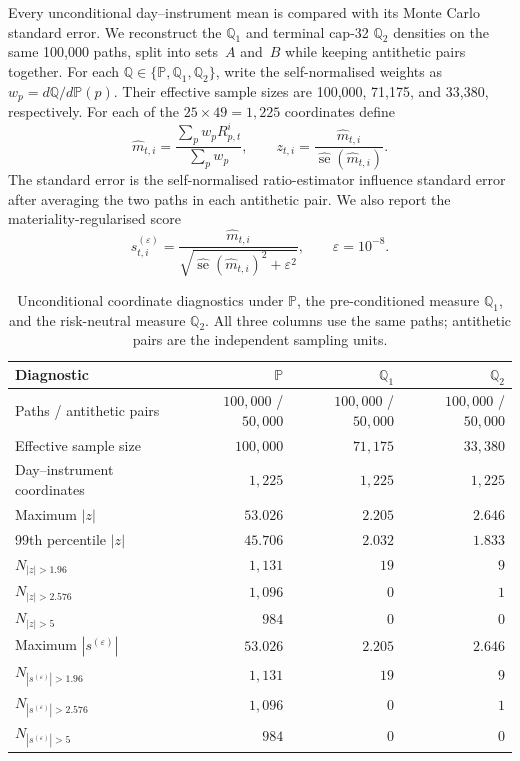\documentclass[11pt,a4paper]{article}
\newcommand{\Q}{\mathbb{Q}}
\renewcommand{\P}{\mathbb{P}}
\renewcommand{\Q}{\mathbb{Q}}
\begin{document}
Every unconditional day--instrument mean is compared with its Monte Carlo
standard error.  We reconstruct the $\Q_1$ and terminal cap-32 $\Q_2$
densities on the same 100,000 paths, split into sets~$A$ and~$B$ while keeping
antithetic pairs together.
For each $\Q\in\{\P,\Q_1,\Q_2\}$, write the self-normalised weights as
$w_p=d\Q/d\P(p)$.  Their effective sample sizes are 100,000, 71,175, and
33,380, respectively.  For each of the $25\times49=1{,}225$ coordinates define
\begin{equation}
  \widehat m_{t,i}
  =\frac{\sum_p w_pR_{p,t}^i}{\sum_p w_p},
  \qquad
  z_{t,i}
  =\frac{\widehat m_{t,i}}
  {\widehat{\operatorname{se}}(\widehat m_{t,i})}.
  \label{eq:rn-unconditional-z}
\end{equation}
The standard error is the self-normalised ratio-estimator influence standard
error after averaging the two paths in each antithetic pair.  We also report
the materiality-regularised score
\begin{equation}
  s_{t,i}^{(\varepsilon)}
  =\frac{\widehat m_{t,i}}
  {\sqrt{\widehat{\operatorname{se}}(\widehat m_{t,i})^2+\varepsilon^2}},
  \qquad \varepsilon=10^{-8}.
  \label{eq:rn-materiality-score}
\end{equation}

\begin{table}[H]
  \centering
  \small
  \begin{tabular}{@{}lrrr@{}}
    \toprule
    Diagnostic & $\P$  & $\Q_1$  & $\Q_2$  \\
    \midrule
    Paths / antithetic pairs
      & $100{,}000$ / $50{,}000$ & $100{,}000$ / $50{,}000$
      & $100{,}000$ / $50{,}000$ \\
    Effective sample size & $100{,}000$ & $71{,}175$ & $33{,}380$ \\
    Day--instrument coordinates & $1{,}225$ & $1{,}225$ & $1{,}225$ \\
    Maximum $|z|$ & $53.026$ & $2.205$ & $2.646$ \\
    99th percentile $|z|$ & $45.706$ & $2.032$ & $1.833$ \\
    $N_{|z|>1.96}$ & $1{,}131$ & $19$ & $9$ \\
    $N_{|z|>2.576}$ & $1{,}096$ & $0$ & $1$ \\
    $N_{|z|>5}$ & $984$ & $0$ & $0$ \\
    Maximum $|s^{(\varepsilon)}|$ & $53.026$ & $2.205$ & $2.646$ \\
    $N_{|s^{(\varepsilon)}|>1.96}$ & $1{,}131$ & $19$ & $9$ \\
    $N_{|s^{(\varepsilon)}|>2.576}$ & $1{,}096$ & $0$ & $1$ \\
    $N_{|s^{(\varepsilon)}|>5}$ & $984$ & $0$ & $0$ \\
    \bottomrule
  \end{tabular}
  \caption{Unconditional coordinate diagnostics under $\P$, the
  pre-conditioned measure $\Q_1$, and the risk-neutral measure $\Q_2$.
  All three columns use the same paths; antithetic pairs are the independent
  sampling units.}
  \label{tab:rn-q2-unconditional}
\end{table}
\end{document}
